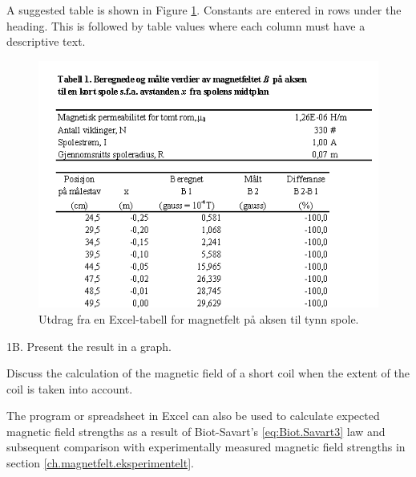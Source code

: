 \documentclass[../Elmag-labhefte-2020.tex]{subfiles}
\begin{document}
A suggested table is shown in Figure \ref{magnetfelt.tab1}.
Constants are entered in rows under the heading. This is followed by table values   where each column must have a descriptive text.
%
\begin{figure}[!ht]
    \begin{center}
    \includegraphics[scale=0.9]{fig/magnetfelt-tab1.png}

    \end{center}
    \caption{%
        Utdrag fra en Excel-tabell for magnetfelt på aksen til tynn spole.
    }
    \label{magnetfelt.tab1}
\end{figure}

{\itsf 1B. Present the result in a graph.}

{\itsf Discuss the calculation of the magnetic field of a short coil when the extent of the coil is taken into account.}

The program or spreadsheet in Excel can also be used to calculate expected magnetic field strengths as a result of Biot-Savart's \eqref{eq:Biot.Savart3} law and subsequent comparison with experimentally measured magnetic field strengths in section \ref{ch.magnetfelt.eksperimentelt}.
\end{document}
